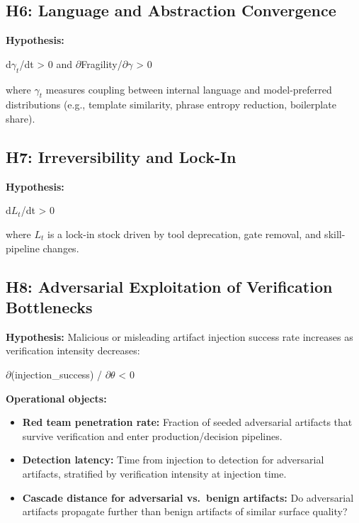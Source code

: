 \documentclass[11pt,a4paper]{article}
\providecommand{\tightlist}{\setlength{\itemsep}{0pt}\setlength{\parskip}{0pt}}
\begin{document}
\hypertarget{h6-language-and-abstraction-convergence}{%
\subsection{ H6: Language and Abstraction Convergence}\label{h6-language-and-abstraction-convergence}}

\textbf{Hypothesis:}

d$\gamma_{t}$/dt > 0 and $\partial$Fragility/$\partial\gamma$ > 0

where $\gamma_{t}$ measures coupling between internal language and model-preferred distributions (e.g., template similarity, phrase entropy reduction, boilerplate share).

\hypertarget{h7-irreversibility-and-lock-in}{%
\subsection{ H7: Irreversibility and Lock-In}\label{h7-irreversibility-and-lock-in}}

\textbf{Hypothesis:}

d$L_t$/dt > 0

where $L_t$ is a lock-in stock driven by tool deprecation, gate removal, and skill-pipeline changes.

\hypertarget{h8-adversarial-exploitation-of-verification-bottlenecks}{%
\subsection{ H8: Adversarial Exploitation of Verification Bottlenecks}\label{h8-adversarial-exploitation-of-verification-bottlenecks}}

\textbf{Hypothesis:} Malicious or misleading artifact injection success rate increases as verification intensity decreases:

$\partial$(injection\_success) / $\partial\theta$ < 0

\textbf{Operational objects:}

\begin{itemize}
\tightlist
\item
  \textbf{Red team penetration rate:} Fraction of seeded adversarial artifacts that survive verification and enter production/decision pipelines.
\item
  \textbf{Detection latency:} Time from injection to detection for adversarial artifacts, stratified by verification intensity at injection time.
\item
  \textbf{Cascade distance for adversarial vs.~benign artifacts:} Do adversarial artifacts propagate further than benign artifacts of similar surface quality?
\end{itemize}
\end{document}
